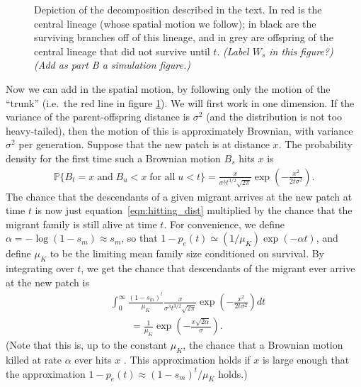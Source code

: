 \documentclass{article}
\renewcommand{\P}{\mathbb{P}}
\newcommand{\deq}{\stackrel{\scriptscriptstyle{d}}{=}}
\newcommand{\plr}[1]{{\it\color{blue}(#1)}}
\begin{document}
\begin{figure}[ht!!]
  \begin{center}
  
  \end{center}
\caption{Depiction of the decomposition described in the text.
In red is the central lineage (whose spatial motion we follow);
in black are the surviving branches off of this lineage, 
and in grey are offspring of the central lineage that did not survive until $t$.
\plr{Label $W_s$ in this figure?}
\plr{Add as part B a simulation figure.}
\label{fig:branching_decomp}
}
\end{figure}

Now we can add in the spatial motion, by following only the motion of the ``trunk''
(i.e.\ the red line in figure \ref{fig:branching_decomp}).
We will first work in one dimension.
If the variance of the parent-offspring distance is $\sigma^2$ (and the distribution is not too heavy-tailed),
then the motion of this is approximately Brownian, with variance $\sigma^2$ per generation.
Suppose that the new patch is at distance $x$.
The probability density for the first time such a Brownian motion $B_s$ hits $x$ is
\citep[XXX]{feller}
\begin{align} \label{eqn:hitting_dist}
  \P\{ B_t=x \;\mbox{and} \; B_u<x \;\mbox{for all}\; u<t\} =  \frac{x}{\sigma^3 t^{3/2}\sqrt{2\pi}} \exp\left(-\frac{x^2}{2t\sigma^2}\right) .
\end{align}
The chance that the descendants of a given migrant arrives at the new patch at time $t$
is now just equation~\eqref{eqn:hitting_dist} multiplied by the chance that 
the migrant family is still alive at time $t$.
For convenience, we define $\alpha = - \log(1-s_m) \approx s_m$,
so that $1-p_e(t) \simeq (1/\mu_K) \exp(-\alpha t)$,
and define $\mu_K$ to be the limiting mean family size conditioned on survival.
By integrating over $t$, we get the chance that descendants of the migrant ever arrive at the new patch is
\begin{align} 
  & \int_0^\infty \frac{(1-s_m)^t}{\mu_K} \frac{x}{\sigma^3 t^{3/2}\sqrt{2\pi}} \exp\left(-\frac{x^2}{2t\sigma^2}\right)  dt \\
  & \qquad = \frac{1}{\mu_K} \exp\left( - \frac{ x \sqrt{2 \alpha}}{\sigma} \right) .\label{eqn:estab_prob}
\end{align}
(Note that this is, up to the constant $\mu_K$, the chance that a Brownian motion killed at rate $\alpha$
ever hits $x$ \citep{feller}.
This approximation holds if $x$ is large enough that the approximation $1-p_e(t) \approx (1-s_m)^t/\mu_K$ holds.)
\end{document}
